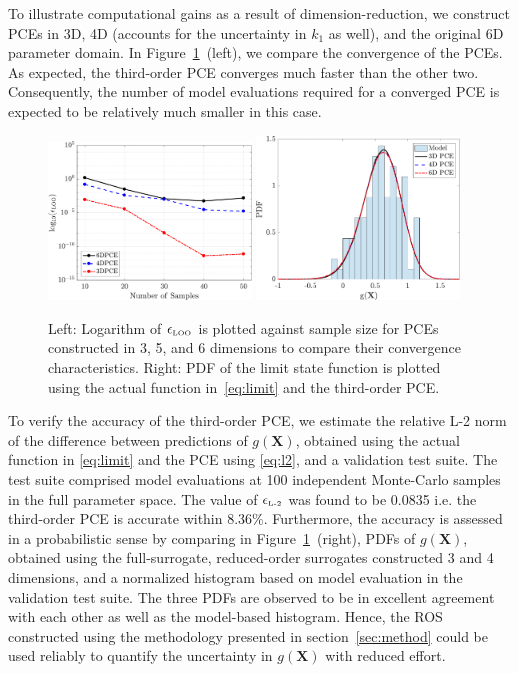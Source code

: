 To illustrate computational gains as a
result of dimension-reduction, we construct PCEs in 3D, 4D (accounts for the
uncertainty in $k_1$ as well), and the original 6D parameter domain. In
Figure~\ref{fig:conv_osc}~(left), we compare the convergence of the
PCEs. As expected, the third-order PCE converges much faster than the other
two. Consequently, the number of model evaluations required for a converged PCE
is expected to be relatively much smaller in this case.  
\begin{figure}[htbp]
 \begin{center}
  \includegraphics[width=0.48\textwidth]{./Figures/err_samples_oscillator}
  \includegraphics[width=0.48\textwidth]{./Figures/pdf_comp_oscillator}
\caption{Left: Logarithm of $\epsilon_{\mbox{\tiny{LOO}}}$ is plotted against sample size for 
PCEs constructed in 3, 5, and 6 dimensions to compare their convergence characteristics. 
Right: PDF of the limit state function is plotted using the actual function in~\eqref{eq:limit}
and the third-order PCE.}
\label{fig:conv_osc}
\end{center}
\end{figure}

To verify the accuracy of the third-order PCE, we estimate the relative L-2
norm of the difference between predictions of  $g(\bm{X})$, obtained using the
actual function in \eqref{eq:limit} and the 
PCE using \eqref{eq:l2}, and a validation test suite. The test suite comprised
model evaluations at 100 independent Monte-Carlo samples in the full 
parameter space. The value of $\epsilon_{\mbox{\tiny{L-2}}}$ 
was found to be 0.0835 i.e. the third-order PCE is accurate within 8.36$\%$.
Furthermore, the accuracy is assessed in a probabilistic sense by comparing
in Figure~\ref{fig:conv_osc}~(right),
PDFs of $g(\bm{X})$, obtained using the full-surrogate, reduced-order 
surrogates constructed 3 and 4 dimensions, and a normalized histogram based
on model evaluation in the validation test suite. The three PDFs are observed
to be in excellent agreement with each other as well as the model-based
histogram. Hence, the ROS constructed using the methodology
presented in section~\ref{sec:method} could be used reliably to 
quantify the uncertainty in $g(\bm{X})$ with reduced effort.

